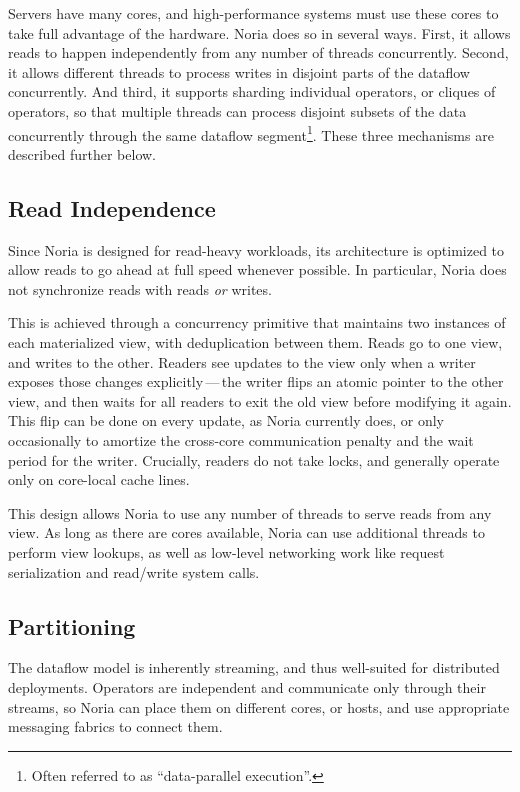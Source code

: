 Servers have many cores, and high-performance systems must use these cores to
take full advantage of the hardware. Noria does so in several ways. First, it
allows reads to happen independently from any number of threads concurrently.
Second, it allows different threads to process writes in disjoint parts of the
dataflow concurrently. And third, it supports sharding individual operators, or
cliques of operators, so that multiple threads can process disjoint subsets of
the data concurrently through the same dataflow segment\footnote{Often referred
to as ``data-parallel execution''.}. These three mechanisms are described
further below.

\subsection{Read Independence}

Since Noria is designed for read-heavy workloads, its architecture is optimized
to allow reads to go ahead at full speed whenever possible. In particular, Noria
does not synchronize reads with reads \emph{or} writes.

This is achieved through a concurrency primitive that maintains two instances of
each materialized view, with deduplication between them. Reads go to one view,
and writes to the other. Readers see updates to the view only when a writer
exposes those changes explicitly\,---\,the writer flips an atomic pointer to the
other view, and then waits for all readers to exit the old view before modifying
it again. This flip can be done on every update, as Noria currently does, or
only occasionally to amortize the cross-core communication penalty and the wait
period for the writer. Crucially, readers do not take locks, and generally
operate only on core-local cache lines.

This design allows Noria to use any number of threads to serve reads from any
view. As long as there are cores available, Noria can use additional threads to
perform view lookups, as well as low-level networking work like request
serialization and read/write system calls.

\subsection{Partitioning}
\label{s:noria:partitioning}

The dataflow model is inherently streaming, and thus well-suited for distributed
deployments. Operators are independent and communicate only through their
streams, so Noria can place them on different cores, or hosts, and use
appropriate messaging fabrics to connect them.

